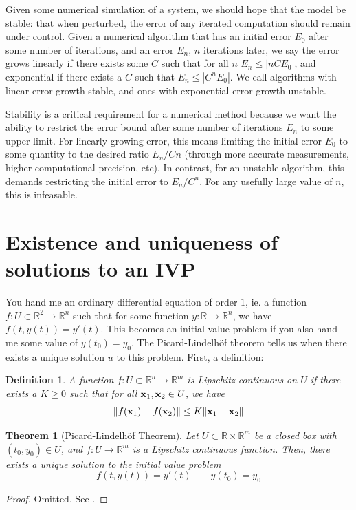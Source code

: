 \documentclass{article}
\newtheorem{definition}{Definition}[section]
\newtheorem{theorem}{Theorem}[section]
\newcommand{\R}{\mathbb{R}}
\newcommand{\x}{\vb{x}}
\newcommand{\0}{\vb{0}}
\begin{document}
Given some numerical simulation of a system, we should hope that the model be stable: that when perturbed, the error of any iterated computation should remain under control. Given a numerical algorithm that has an initial error $E_0$ after some number of iterations, and an error $E_n$, $n$ iterations later, we say the error grows linearly if there exists some $C$ such that for all $n$ $E_n \leq |nCE_0|$, and exponential if there exists a $C$ such that $E_n \leq |C^nE_0|$. We call algorithms with linear error growth stable, and ones with exponential error growth unstable.

Stability is a critical requirement for a numerical method because we want the ability to restrict the error bound after some number of iterations $E_n$ to some upper limit. For linearly growing error, this means limiting the initial error $E_0$ to some quantity to the desired ratio $E_n/Cn$ (through more accurate measurements, higher computational precision, etc). In contrast, for an unstable algorithm, this demands restricting the initial error to $E_n/C^n$. For any usefully large value of $n$, this is infeasable.

\section{Existence and uniqueness of solutions to an IVP}

You hand me an ordinary differential equation of order $1$, ie. a function $f: U \subset \R^{2} \to \R^n$ such that for some function $y: \R\to \R^n$, we have $f(t, y(t)) = y'(t)$. This becomes an initial value problem if you also hand me some value of $y(t_0) = y_0$. The Picard-Lindelh\"of theorem tells us when there exists a unique solution $u$ to this problem. First, a definition:

\begin{definition}
  A function $f: U \subset \R^n \to \R^m$ is Lipschitz continuous on $U$ if there exists a $K \geq 0$ such that for all $\x_1, \x_2 \in U$, we have
  \[\norm{f(\x_1) - f(\x_2)} \leq K\norm{\x_1 - \x_2}\]
\end{definition}

\begin{theorem}[Picard-Lindelh\"of Theorem]
  \label{plt}
  Let $U \subset \R\times\R^m$ be a closed box with $(t_0, y_0) \in U$, and $f: U \to \R^m$ is a Lipschitz continuous function. Then, there exists a unique solution to the initial value problem
  \[f(t, y(t)) = y'(t) \qquad y(t_0) = y_0\]
\end{theorem}
\begin{proof}
  Omitted. See \cite{coddington1955}.
\end{proof}
\end{document}
